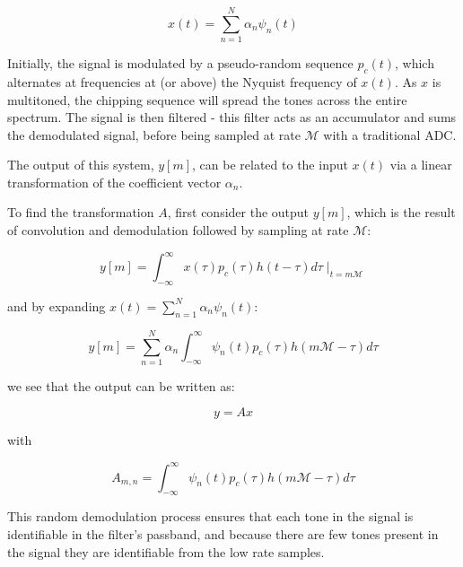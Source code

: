 \begin{equation}
x\left(t\right) = \sum_{n=1}^N \alpha_n \psi_n\left(t\right)
\end{equation}

Initially, the signal is modulated by a pseudo-random sequence \(p_c\left(t\right)\), which alternates at frequencies at (or above) the Nyquist frequency of \(x\left(t\right)\). As \(x\) is multitoned, the chipping sequence will spread the tones across the entire spectrum. The signal is then filtered - this filter acts as an accumulator and sums the demodulated signal, before being sampled at rate \(\mathcal{M}\) with a traditional ADC.

The output of this system, \(y\left[m\right]\), can be related to the input \(x\left(t\right)\) via a linear transformation of the coefficient vector \(\alpha_n\). 

To find the transformation \(A\), first consider the output \(y\left[m\right]\), which is the result of convolution and demodulation followed by sampling at rate \(\mathcal{M}\):

\begin{equation}
y\left[m\right] = \int_{-\infty}^{\infty} x\left(\tau\right)p_c\left(\tau\right)h\left(t - \tau\right)d\tau\mid_{t = m\mathcal{M}}
\end{equation}

and by expanding \(x\left(t\right) = \sum_{n=1}^N \alpha_n \psi_n\left(t\right)\):

\begin{equation}
y\left[m\right] =  \sum_{n=1}^N \alpha_n \int_{-\infty}^{\infty} \psi_n\left(t\right)p_c\left(\tau\right)h\left(m\mathcal{M} - \tau\right)d\tau
\end{equation}

we see that the output can be written as:

\begin{equation}
y = Ax
\end{equation}

with

\begin{equation}
A_{m,n} = \int_{-\infty}^{\infty} \psi_n\left(t\right)p_c\left(\tau\right)h\left(m\mathcal{M} - \tau\right)d\tau
\end{equation}

This random demodulation process ensures that each tone in the signal is identifiable in the filter's passband, and because there are few tones present in the signal they are identifiable from the low rate samples. 


